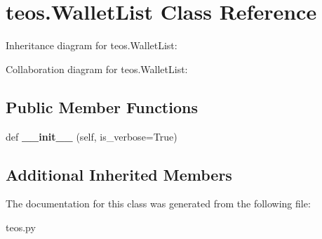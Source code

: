 \hypertarget{classteos_1_1WalletList}{}\section{teos.\+Wallet\+List Class Reference}
\label{classteos_1_1WalletList}


Inheritance diagram for teos.\+Wallet\+List\+:


Collaboration diagram for teos.\+Wallet\+List\+:
\subsection*{Public Member Functions}
\begin{DoxyCompactItemize}
\item 
\mbox{\label{classteos_1_1WalletList_aef77fd40c486c9017a86c493860aa771}} 
def {\bfseries \+\_\+\+\_\+init\+\_\+\+\_\+} (self, is\+\_\+verbose=True)
\end{DoxyCompactItemize}
\subsection*{Additional Inherited Members}


The documentation for this class was generated from the following file\+:\begin{DoxyCompactItemize}
\item 
teos.\+py\end{DoxyCompactItemize}
